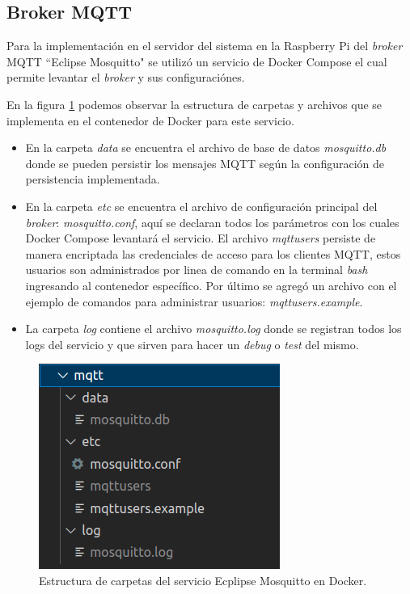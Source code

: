 \subsection{Broker MQTT}
\label{subsec:mqttbroker}

Para la implementación en el servidor del sistema en la Raspberry Pi del \textit{broker} MQTT ``Eclipse Mosquitto" se utilizó un servicio de Docker Compose el cual permite levantar el \textit{broker} y sus configuraciónes.

En la figura \ref{fig:mqttestructuracarpetas} podemos observar la estructura de carpetas y archivos que se implementa en el contenedor de Docker para este servicio. 

\begin{itemize}
	\item En la carpeta \textit{data} se encuentra el archivo de base de datos \textit{mosquitto.db} donde se pueden persistir los mensajes MQTT según la configuración de persistencia implementada.
	\item En la carpeta \textit{etc} se encuentra el archivo de configuración principal del \textit{broker}: \textit{mosquitto.conf}, aquí se declaran todos los parámetros con los cuales Docker Compose levantará el servicio. El archivo \textit{mqttusers} persiste de manera encriptada las credenciales de acceso para los clientes MQTT, estos usuarios son administrados por linea de comando en la terminal \textit{bash} ingresando al contenedor específico. Por último se agregó un archivo con el ejemplo de comandos para administrar usuarios: \textit{mqttusers.example}.
	\item La carpeta \textit{log} contiene el archivo \textit{mosquitto.log} donde se registran todos los logs del servicio y que sirven para hacer un \textit{debug} o \textit{test} del mismo.	
\end{itemize}

\begin{figure}[ht]
	\centering
	\includegraphics[scale=.60]{./Figures/mqtt-estructura-carpetas.png}
	\caption{Estructura de carpetas del servicio Ecplipse Mosquitto en Docker.}
	\label{fig:mqttestructuracarpetas}
\end{figure}

